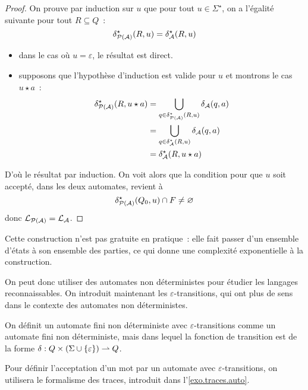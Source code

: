 \begin{proof}
  On prouve par induction sur $u$ que pour tout $u \in \Sigma^\star$, on a
  l'égalité suivante pour tout $R \subseteq Q$~:
  \[\delta^\star_{\mathcal{P}(\mathcal A)}(R,u) = \delta^\star_{\mathcal A}(R,u)\]
  \begin{itemize}
  \item dans le cas où $u = \varepsilon$, le résultat est direct.
  \item supposons que l'hypothèse d'induction est valide pour $u$ et montrons
    le cas $u \star a$~:
    \begin{align*}
      \delta^\star_{\mathcal{P}(\mathcal A)}(R,u\star a) &=
      \bigcup_{q \in \delta^\star_{\mathcal{P}(\mathcal A)}(R,u)}
      \delta_{\mathcal A}(q,a)\\
      &= \bigcup_{q \in \delta^\star_\mathcal A(R,u)} \delta_\mathcal A(q,a)\\
      &= \delta_\mathcal A^\star(R,u\star a)
    \end{align*}
  \end{itemize}
  D'où le résultat par induction. On voit alors que la condition pour que
  $u$ soit accepté, dans les deux automates, revient à
  \[\delta_{\mathcal{P}(\mathcal A)}^\star (Q_0,u) \cap F \neq \varnothing\]
  donc $\mathcal L_{\mathcal{P}(\mathcal A)} = \mathcal L_\mathcal A$.
\end{proof}

\begin{remark}
  Cette construction n'est pas gratuite en pratique~: elle fait passer d'un
  ensemble d'états à son ensemble des parties, ce qui donne une complexité
  exponentielle à la construction.
\end{remark}

On peut donc utiliser des automates non déterministes pour étudier les langages
reconnaissables. On introduit maintenant les $\varepsilon$-transitions, qui
ont plus de sens dans le contexte des automates non déterministes.

\begin{definition}
  On définit un automate fini non déterministe avec $\varepsilon$-transitions
  comme un automate fini non déterministe, mais dans lequel la fonction de
  transition est de la forme
  $\delta : Q\times (\Sigma \cup \{\varepsilon\}) \rightharpoonup Q$.
\end{definition}

Pour définir l'acceptation d'un mot par un automate avec
$\varepsilon$-transitions, on utilisera le formalisme des traces, introduit dans
l'\cref{exo.traces.auto}.

